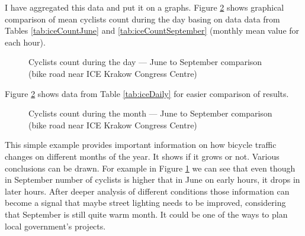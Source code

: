 I have aggregated this data and put it on a graphs. Figure \ref{fig:graph2} shows graphical comparison of mean cyclists count during the day basing on data data from Tables \ref{tab:iceCountJune} and \ref{tab:iceCountSeptember} (monthly mean value for each hour).
\begin{figure}[H]
    \centering
    \caption{Cyclists count during the day --- June to September comparison (bike road near ICE Krakow Congress Centre)}
    \label{fig:graph4}
\end{figure}
Figure \ref{fig:graph2} shows data from Table \ref{tab:iceDaily} for easier comparison of results.
\begin{figure}[H]
    \centering
    \caption{Cyclists count during the month --- June to September comparison (bike road near ICE Krakow Congress Centre)}
    \label{fig:graph2}
\end{figure}
This simple example provides important information on how bicycle traffic changes on different months of the year. It shows if it grows or not. Various conclusions can be drawn. For example in Figure \ref{fig:graph4} we can see that even though in September number of cyclists is higher that in June on early hours, it drops in later hours. After deeper analysis of different conditions those information can become a signal that maybe street lighting needs to be improved, considering that September is still quite warm month. It could be one of the ways to plan local government's projects.
